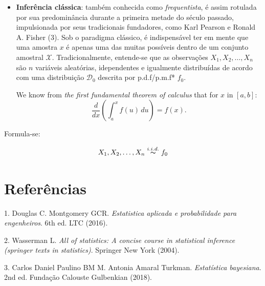 \documentclass[]{tufte-handout}
\providecommand{\tightlist}{%
  \setlength{\itemsep}{0pt}\setlength{\parskip}{0pt}}
\begin{document}
\begin{itemize}
\tightlist
\item
  \textbf{Inferência clássica}: também conhecida como
  \emph{frequentista}, é assim rotulada por sua predominância durante a
  primeira metade do século passado, impulsionada por seus tradicionais
  fundadores, como Karl Pearson e Ronald A. Fisher (3). Sob o paradigma
  clássico, é indispensável ter em mente que uma amostra \(x\) é apenas
  uma das muitas possíveis dentro de um conjunto amostral
  \(\mathcal{X}\). Tradicionalmente, entende-se que as observações
  \(X_1, X_2, \dots, X_n\) são \(n\) variáveis aleatórias, idependentes
  e igualmente distribuídas de acordo com uma distribuição
  \(\mathcal{D_0}\) descrita por p.d.f/p.m.f* \(f_0\).

  \begin{marginfigure}
  We know from \emph{the first fundamental theorem of calculus} that for
  \(x\) in \([a, b]\):
  \[\frac{d}{dx}\left( \int_{a}^{x} f(u)\,du\right)=f(x).\]
  \end{marginfigure}
\end{itemize}

Formula-se:

\[
X_1, X_2, \dots, X_n \overset{i.i.d.}{\thicksim} f_0
\]

\hypertarget{referuxeancias}{%
\section*{Referências}\label{referuxeancias}}

\hypertarget{refs}{}
\leavevmode\hypertarget{ref-Montgomery2016}{}%
1. Douglas C. Montgomery GCR. \emph{Estatistica aplicada e probabilidade
para engenheiros}. 6th ed. LTC (2016).

\leavevmode\hypertarget{ref-Wasserman2010}{}%
2. Wasserman L. \emph{All of statistics: A concise course in statistical
inference (springer texts in statistics)}. Springer New York (2004).

\leavevmode\hypertarget{ref-Paulino2018}{}%
3. Carlos Daniel Paulino BM M. Antonia Amaral Turkman. \emph{Estatística
bayesiana}. 2nd ed. Fundação Calouste Gulbenkian (2018).
\end{document}
